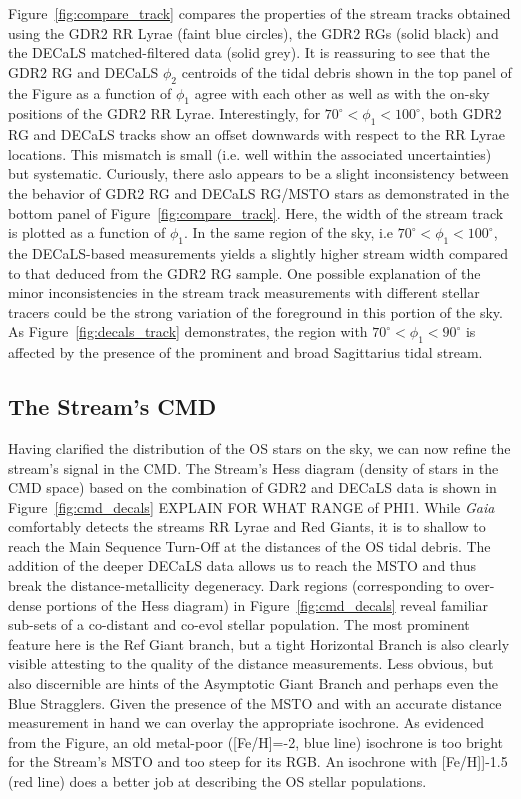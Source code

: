 \documentclass[a4paper,useAMS,usenatbib]{mnras}
\newcommand{\gaia}{\textit{Gaia} }
\begin{document}
Figure~\ref{fig:compare_track} compares the properties of the stream
tracks obtained using the GDR2 RR Lyrae (faint blue circles), the GDR2
RGs (solid black) and the DECaLS matched-filtered data (solid
grey). It is reassuring to see that the GDR2 RG and DECaLS $\phi_2$
centroids of the tidal debris shown in the top panel of the Figure as
a function of $\phi_1$ agree with each other as well as with the
on-sky positions of the GDR2 RR Lyrae. Interestingly, for
$70^{\circ}<\phi_1<100^{\circ}$, both GDR2 RG and DECaLS tracks show
an offset downwards with respect to the RR Lyrae locations. This
mismatch is small (i.e. well within the associated uncertainties) but
systematic. Curiously, there aslo appears to be a slight inconsistency
between the behavior of GDR2 RG and DECaLS RG/MSTO stars as
demonstrated in the bottom panel of
Figure~\ref{fig:compare_track}. Here, the width of the stream track is
plotted as a function of $\phi_1$. In the same region of the sky, i.e
$70^{\circ}<\phi_1<100^{\circ}$, the DECaLS-based measurements yields
a slightly higher stream width compared to that deduced from the GDR2
RG sample. One possible explanation of the minor inconsistencies in
the stream track measurements with different stellar tracers could be
the strong variation of the foreground in this portion of the sky. As
Figure~\ref{fig:decals_track} demonstrates, the region with
$70^{\circ}<\phi_1<90^{\circ}$ is affected by the presence of the
prominent and broad Sagittarius tidal stream.

\subsection{The Stream's CMD}

Having clarified the distribution of the OS stars on the sky, we can
now refine the stream's signal in the CMD. The Stream's Hess diagram
(density of stars in the CMD space) based on the combination of GDR2
and DECaLS data is shown in Figure~\ref{fig:cmd_decals} EXPLAIN FOR
WHAT RANGE of PHI1. While \gaia comfortably detects the streams RR
Lyrae and Red Giants, it is to shallow to reach the Main Sequence
Turn-Off at the distances of the OS tidal debris. The addition of the
deeper DECaLS data allows us to reach the MSTO and thus break the
distance-metallicity degeneracy. Dark regions (corresponding to
over-dense portions of the Hess diagram) in
Figure~\ref{fig:cmd_decals} reveal familiar sub-sets of a co-distant
and co-evol stellar population. The most prominent feature here is the
Ref Giant branch, but a tight Horizontal Branch is also clearly
visible attesting to the quality of the distance measurements. Less
obvious, but also discernible are hints of the Asymptotic Giant Branch
and perhaps even the Blue Stragglers. Given the presence of the MSTO
and with an accurate distance measurement in hand we can overlay the
appropriate isochrone. As evidenced from the Figure, an old metal-poor
([Fe/H]=-2, blue line) isochrone is too bright for the Stream's MSTO
and too steep for its RGB. An isochrone with [Fe/H]]-1.5 (red line)
  does a better job at describing the OS stellar populations.
\end{document}
